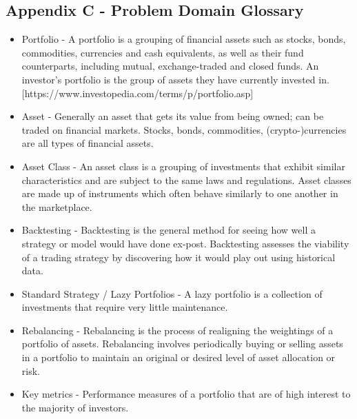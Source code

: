 \documentclass[main.tex]{subfiles}
\begin{document}
\subsection{Appendix C - Problem Domain Glossary}
\begin{itemize}
    \item Portfolio - A portfolio is a grouping of financial assets such as stocks, bonds,
commodities, currencies and cash equivalents, as well as their fund counterparts, including mutual, exchange-traded and closed funds. An investor's portfolio is the group of assets they have currently invested in. [https://www.investopedia.com/terms/p/portfolio.asp]
    \item Asset - Generally an asset that gets its value from being owned; can be traded
on financial markets. Stocks, bonds, commodities, (crypto-)currencies are all types of financial assets. 
    \item Asset Class - An asset class is a grouping of investments that exhibit similar
characteristics and are subject to the same laws and regulations. Asset
classes are made up of instruments which often behave similarly to one
another in the marketplace. 
    \item Backtesting - Backtesting is the general method for seeing how well a strategy or
model would have done ex-post. Backtesting assesses the viability of a trading strategy by discovering how it would play out using historical data.
    \item Standard Strategy / Lazy Portfolios - A lazy portfolio is a collection of investments that require very little maintenance.
    \item Rebalancing - Rebalancing is the process of realigning the weightings of a portfolio of assets. Rebalancing involves periodically buying or selling assets in a portfolio to maintain an original or desired level of asset allocation or risk. 
    \item Key metrics - Performance measures of a portfolio that are of high interest to the majority of investors.

\end{itemize}
\end{document}
